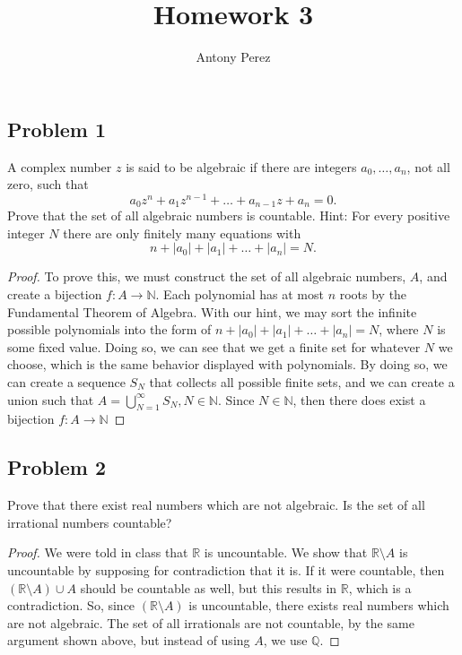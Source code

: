 \documentclass{amsart}
\title{Homework 3}
\author{Antony Perez}
\begin{document}
\maketitle
\subsection*{Problem 1} A complex number $z$ is said to be algebraic if there are integers $a_0, \ldots, a_n$, not all zero, such that 
\[a_0z^n + a_1z^{n-1}+\ldots+a_{n-1}z + a_n = 0.\]
Prove that the set of all algebraic numbers is countable. Hint: For every positive integer $N$ there are only finitely many equations with 
\[n + |a_0| + |a_1|+ \ldots + |a_n| = N.\]
\begin{proof}
    To prove this, we must construct the set of all algebraic numbers, $A$, and create a bijection $f: A \rightarrow \mathbb{N}$. Each polynomial has at most $n$ roots by the Fundamental Theorem of Algebra. With our hint, we may sort the infinite possible polynomials into the form of $n + |a_0| + |a_1|+ \ldots + |a_n| = N$, where $N$ is some fixed value. Doing so, we can see that we get a finite set for whatever $N$ we choose, which is the same behavior displayed with polynomials. By doing so, we can create a sequence $S_N$ that collects all possible finite sets, and we can create a union such that $A = \bigcup_{N=1}^{\infty} S_N, N \in \mathbb{N}$. Since $N \in \mathbb{N}$, then there does exist a bijection $f: A \rightarrow \mathbb{N}$
\end{proof}
\subsection*{Problem 2} Prove that there exist real numbers which are not algebraic. Is the set of all irrational numbers countable? 
\begin{proof}
    We were told in class that $\mathbb{R}$ is uncountable. We show that $\mathbb{R} \setminus A$ is uncountable by supposing for contradiction that it is. If it were countable, then $(\mathbb{R} \setminus A) \cup A$ should be countable as well, but this results in $\mathbb{R}$, which is a contradiction. So, since $(\mathbb{R} \setminus A)$ is uncountable, there exists real numbers which are not algebraic. The set of all irrationals are not countable, by the same argument shown above, but instead of using $A$, we use $\mathbb{Q}$.
\end{proof}
\end{document}
